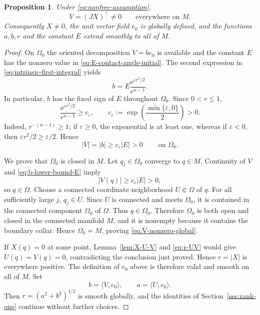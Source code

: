 \documentclass[11pt,a4paper]{article}
\numberwithin{equation}{section}
\newtheorem{proposition}[theorem]{Proposition}
\newcommand{\ee}{\mathrm e}
\begin{document}
\begin{proposition}\label{prop:global-nondegeneracy}
Under \eqref{eq:nonfree-assumption},
\begin{equation}\label{eq:V-nonzero-global}
        V=(JX)^\top\ne0
        \qquad\text{everywhere on }M.
\end{equation}
Consequently $X\ne0$, the unit vector field $e_0$ is globally defined, and the functions $a,b,r$ and the constant $E$ extend smoothly to all of $M$.
\end{proposition}

\begin{proof}
On $\Omega_0$ the oriented decomposition $V=b e_0$ is available and the
constant $E$ has the nonzero value in \eqref{eq:E-contact-angle-initial}.  The
second expression in \eqref{eq:intrinsic-first-integral} yields
\begin{equation*}
        b=E\frac{\ee^{\varepsilon r^2/2}}{r^{n-1}}.
\end{equation*}
In particular, $b$ has the fixed sign of $E$ throughout $\Omega_0$.  Since
$0<r\le1$,
$$
        \frac{\ee^{\varepsilon r^2/2}}{r^{n-1}}
        \ge c_\varepsilon,
        \qquad
        c_\varepsilon:=\exp\!\left(\frac{\min\{\varepsilon,0\}}2\right)>0.
$$
Indeed, $r^{-(n-1)}\ge1$; if $\varepsilon\ge0$, the exponential is at least one,
whereas if $\varepsilon<0$, then $\varepsilon r^2/2\ge\varepsilon/2$.  Hence
\begin{equation}\label{eq:b-lower-bound-E}
        |V|=|b|\ge c_\varepsilon|E|>0
        \qquad\ \text{on }\Omega_0.
\end{equation}

We prove that $\Omega_0$ is closed in $M$.  Let $q_j\in\Omega_0$ converge to
$q\in M$.  Continuity of $V$ and \eqref{eq:b-lower-bound-E} imply
$$
        |V(q)|\ge c_\varepsilon|E|>0,
$$
so $q\in\Omega$.  Choose a connected coordinate neighborhood
$U\Subset\Omega$ of $q$.  For all sufficiently large $j$, $q_j\in U$.  Since
$U$ is connected and meets $\Omega_0$, it is contained in the connected
component $\Omega_0$ of $\Omega$.  Thus $q\in\Omega_0$.  Therefore $\Omega_0$
is both open and closed in the connected manifold $M$, and it is nonempty
because it contains the boundary collar.  Hence $\Omega_0=M$, proving
\eqref{eq:V-nonzero-global}.

If $X(q)=0$ at some point, Lemma~\ref{lem:X-U-V} and
\eqref{eq:r-UV} would give $U(q)=V(q)=0$, contradicting the conclusion just
proved.  Hence $r=|X|$ is everywhere positive.  The definition of $e_0$ above is therefore valid and smooth on all of $M$. Set
$$
        b=\langle V,e_0\rangle,
        \qquad
        a=\langle U,e_0\rangle.
$$
Then
$r=(a^2+b^2)^{1/2}$ is smooth globally, and the
identities of Section~\ref{sec:rank-one} continue without further choices.
\end{proof}
\end{document}
